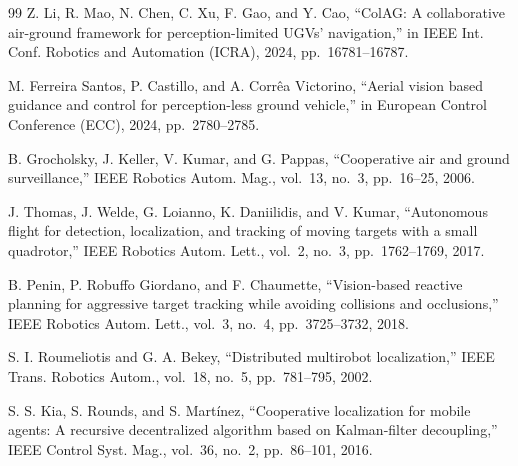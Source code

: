 \documentclass[letterpaper, 10 pt, conference]{ieeeconf}  %
\begin{document}
\begin{thebibliography}{99}
 Z. Li, R. Mao, N. Chen, C. Xu, F. Gao, and Y. Cao, ``ColAG: A
collaborative air-ground framework for perception-limited UGVs' navigation,'' in {IEEE
Int. Conf. Robotics and Automation (ICRA)}, 2024, pp.~16781--16787.

 M. Ferreira Santos, P. Castillo, and A. Corr\^ea Victorino,
``Aerial vision based guidance and control for perception-less ground vehicle,'' in
{European Control Conference (ECC)}, 2024, pp.~2780--2785.

 B. Grocholsky, J. Keller, V. Kumar, and G. Pappas,
``Cooperative air and ground surveillance,'' {IEEE Robotics Autom. Mag.}, vol.~13, no.~3,
pp.~16--25, 2006.

 J. Thomas, J. Welde, G. Loianno, K. Daniilidis, and V. Kumar,
``Autonomous flight for detection, localization, and tracking of moving targets with a small
quadrotor,'' {IEEE Robotics Autom. Lett.}, vol.~2, no.~3, pp.~1762--1769, 2017.

 B. Penin, P. Robuffo Giordano, and F. Chaumette, ``Vision-based
reactive planning for aggressive target tracking while avoiding collisions and occlusions,''
{IEEE Robotics Autom. Lett.}, vol.~3, no.~4, pp.~3725--3732, 2018.

 S. I. Roumeliotis and G. A. Bekey, ``Distributed
multirobot localization,'' {IEEE Trans. Robotics Autom.}, vol.~18, no.~5, pp.~781--795,
2002.

 S. S. Kia, S. Rounds, and S. Mart\'inez, ``Cooperative
localization for mobile agents: A recursive decentralized algorithm based on Kalman-filter
decoupling,'' {IEEE Control Syst. Mag.}, vol.~36, no.~2, pp.~86--101, 2016.

\end{thebibliography}
\end{document}
